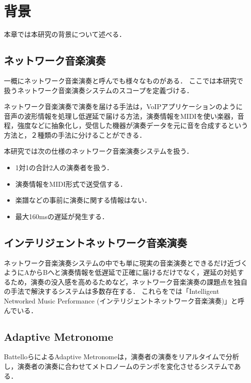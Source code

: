 \chapter{背景}
\label{background}

本章では本研究の背景について述べる．

\section{ネットワーク音楽演奏}
\label{background:nmp}
一概にネットワーク音楽演奏と呼んでも様々なものがある．
ここでは本研究で扱うネットワーク音楽演奏システムのスコープを定義づける．



ネットワーク音楽演奏で演奏を届ける手法は，VoIPアプリケーションのように音声の波形情報を処理し低遅延で届ける方法\cite{syncroom}\cite{lola}\cite{jacktrip}，演奏情報をMIDIを使い楽器，音程，強度などに抽象化し，受信した機器が演奏データを元に音を合成するという方法\cite{rtpmidi}\cite{sourcenode}と，２種類の手法に分けることができる．

本研究では次の仕様のネットワーク音楽演奏システムを扱う．

\begin{itemize}
  \item 1対1の合計2人の演奏者を扱う．
  \item 演奏情報をMIDI形式で送受信する．
  \item 楽譜などの事前に演奏に関する情報はない．
  \item 最大160msの遅延が発生する．
\end{itemize}

\section{インテリジェントネットワーク音楽演奏}
ネットワーク音楽演奏システムの中でも単に現実の音楽演奏とできるだけ近づくようにAからBへと演奏情報を低遅延で正確に届けるだけでなく，遅延の対処するため，演奏の没入感を高めるためなど，ネットワーク音楽演奏の課題点を独自の手法で解決するシステムは多数存在する．
これらを\cite{impedence}では「Intelligent Networked Music Performance (インテリジェントネットワーク音楽演奏)」と呼んでいる．
\cite{tablanet}\cite{alexandraki:2014}\cite{alexandraki:2013} \cite{admet}

\section{Adaptive Metronome}
BattelloらによるAdaptive Metronome\cite{admet}\cite{admet:experiment}は，演奏者の演奏をリアルタイムで分析し，演奏者の演奏に合わせてメトロノームのテンポを変化させるシステムである．

